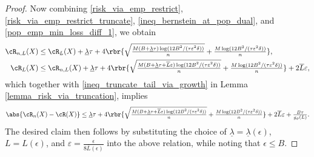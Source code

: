\documentclass[9pt]{article} %
\numberwithin{equation}{section}
\renewcommand{\frac}[2]{\tfrac{#1}{#2}}
\begin{document}
\begin{proof}
Now combining \eqref{risk_via_emp_restrict}, \eqref{risk_via_emp_restrict_truncate}, \eqref{ineq_bernstein_at_pop_dual}, and \eqref{pop_emp_min_loss_diff_1}, we obtain 
\begin{align*}
\cR_{n,L}(X) & \leq \cR_L(X) + \underline{\lambda} \tau + 4 \rbr{
\sqrt{\frac{ M 
(B + \underline{\lambda} \tau  )
 \log(12B^2/(\tau \varepsilon^2 \delta))}{n}} + \frac{ M \log(12B^2/(\tau \varepsilon^2 \delta))}{n} 
}, \\
\cR_L(X) & \leq \cR_{n,L}(X) + \underline{\lambda} \tau 
+  4 \rbr{
\sqrt{\frac{ M 
(B + \underline{\lambda} \tau + \overline{L} \varepsilon)
 \log(12B^2/(\tau \varepsilon^2 \delta))}{n}} + \frac{ M \log(12B^2/(\tau \varepsilon^2 \delta))}{n} 
}  + 2 \overline{L} \varepsilon,
\end{align*}
which together with \eqref{ineq_truncate_tail_via_growth} in Lemma \ref{lemma_risk_via_truncation}, implies
\begin{align*}
\abs{ \cR_{n} (X) - \cR(X)} 
\leq 
 \underline{\lambda} \tau 
+  4 \rbr{
\sqrt{\frac{ M 
(B + \underline{\lambda} \tau + \overline{L} \varepsilon)
 \log(12B^2/(\tau \varepsilon^2 \delta))}{n}} + \frac{ M \log(12B^2/(\tau \varepsilon^2 \delta))}{n} 
}  + 2 \overline{L} \varepsilon
+ \frac{B\tau}{g_\phi(L)}.
\end{align*}
The desired claim then follows by substituting the choice of 
$\underline{\lambda} = \underline{\lambda}(\epsilon)$,
$L = L(\epsilon)$, and $\varepsilon = \frac{\epsilon}{8 \overline{L}(\epsilon)}$ into the above relation, 
while noting that $\epsilon \leq B$.
\end{proof}
\end{document}
